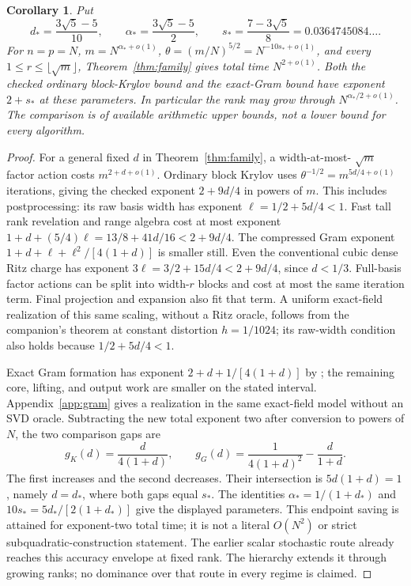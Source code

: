 \documentclass[11pt]{article}
\newtheorem{corollary}[theorem]{Corollary}
\begin{document}
\begin{corollary}\label{cor:optimized}
Put
\[
 d_* =\frac{3\sqrt5-5}{10},\qquad
 \alpha_* =\frac{3\sqrt5-5}{2},\qquad
 s_* =\frac{7-3\sqrt5}{8}=0.0364745084\ldots .
\]
For \(n=p=N\), \(m=N^{\alpha_*+o(1)}\),
\(\theta=(m/N)^{5/2}=N^{-10s_*+o(1)}\), and every
\(1\leq r\leq\lfloor\sqrt m\rfloor\), Theorem~\ref{thm:family}
gives total time \(N^{2+o(1)}\).
Both the checked ordinary block-Krylov bound and the exact-Gram bound
have exponent \(2+s_*\) at these parameters. In particular the rank
may grow through \(N^{\alpha_*/2+o(1)}\).
The comparison is of available arithmetic upper bounds, not a lower
bound for every algorithm.
\end{corollary}
\begin{proof}
For a general fixed \(d\) in Theorem~\ref{thm:family}, a width-at-most-
\(\sqrt m\) factor action costs \(m^{2+d+o(1)}\). Ordinary block
Krylov \cite{mm} uses \(\theta^{-1/2}=m^{5d/4+o(1)}\) iterations,
giving the checked exponent \(2+9d/4\) in powers of \(m\).
This includes postprocessing: its raw basis width has exponent
\(\ell=1/2+5d/4<1\). Fast tall rank revelation and range algebra cost
at most exponent
\(1+d+(5/4)\ell=13/8+41d/16<2+9d/4\).
The compressed Gram exponent
\(1+d+\ell+\ell^2/[4(1+d)]\) is smaller still.
Even the conventional cubic dense Ritz charge has exponent
\(3\ell=3/2+15d/4<2+9d/4\), since \(d<1/3\).
Full-basis factor actions can be split into width-\(r\) blocks and
cost at most the same iteration term. Final projection and expansion
also fit that term. A uniform exact-field realization of this same
scaling, without a Ritz oracle, follows from the companion's theorem
at constant distortion \(h=1/1024\); its raw-width condition also
holds because \(1/2+5d/4<1\).

Exact Gram formation has exponent
\(2+d+1/[4(1+d)]\) by \cite{amanov}; the remaining core, lifting,
and output work are smaller on the stated interval. Appendix~\ref{app:gram}
gives a realization in the same exact-field model without an SVD oracle.
Subtracting the new total exponent two after conversion to powers of
\(N\), the two comparison gaps are
\[
 g_K(d)=\frac{d}{4(1+d)},\qquad
 g_G(d)=\frac{1}{4(1+d)^2}-\frac{d}{1+d}.
\]
The first increases and the second decreases. Their intersection is
\(5d(1+d)=1\), namely \(d=d_*\), where both gaps equal \(s_*\).
The identities \(\alpha_*=1/(1+d_*)\) and
\(10s_*=5d_*/[2(1+d_*)]\) give the displayed parameters.
This endpoint saving is attained for exponent-two total time; it is
not a literal \(O(N^2)\) or strict subquadratic-construction statement.
The earlier scalar stochastic route already reaches this accuracy
envelope at fixed rank. The hierarchy extends it through growing ranks;
no dominance over that route in every regime is claimed.
\end{proof}
\end{document}
